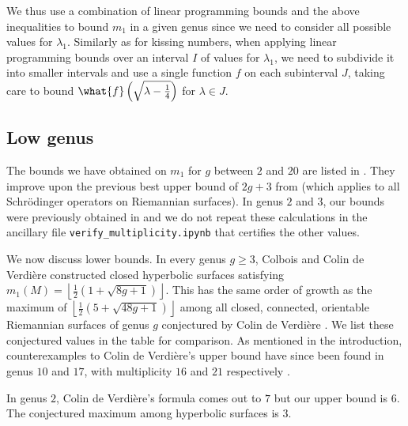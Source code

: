 \documentclass[12pt]{amsart}
\numberwithin{equation}{section}
\begin{document}
We thus use a combination of linear programming bounds and the above inequalities to bound $m_1$ in a given genus since we need to consider all possible values for $\lambda_1$. Similarly as for kissing numbers, when applying linear programming bounds over an interval $I$ of values for $\lambda_1$, we need to subdivide it into smaller intervals and use a single function $f$ on each subinterval $J$, taking care to bound $\what{f}\left(\sqrt{\lambda-\frac14}\right)$ for $\lambda \in J$.

\subsection{Low genus}  \label{subsec:multiplicity_examples}

The bounds we have obtained on $m_1$ for $g$ between $2$ and $20$ are listed in .  They improve upon the previous best upper bound of $2g+3$ from \cite{Sevennec} (which applies to all Schr\"odinger operators on Riemannian surfaces). In genus $2$ and $3$, our bounds were previously obtained in \cite{Klein} and we do not repeat these calculations in the ancillary file \texttt{verify\_multiplicity.ipynb} that certifies the other values. 

We now discuss lower bounds. In  every genus $g\geq 3$, Colbois and Colin de Verdière \cite{CCV} constructed closed hyperbolic surfaces satisfying
$
m_1(M) = \left\lfloor \frac12 \left( 1 + \sqrt{8g+1}\right) \right\rfloor.
$
This has the same order of growth as the maximum of $\left\lfloor \frac12\left( 5 + \sqrt{48g+1} \right) \right\rfloor$ among all closed, connected, orientable Riemannian surfaces of genus $g$  conjectured by Colin de Verdière \cite{CdV86,CdV}. We list these conjectured values in the table for comparison. As mentioned in the introduction, counterexamples to Colin de Verdière's upper bound have since been found in genus $10$ and $17$, with multiplicity $16$ and $21$ respectively \cite{counterexamples}.

In genus $2$, Colin de Verdière's formula comes out to $7$ but our upper bound is $6$. The conjectured maximum among hyperbolic surfaces is $3$.
\end{document}
